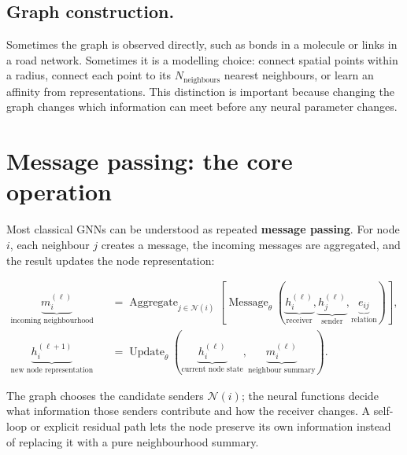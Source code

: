 \subsection{Graph construction.}
Sometimes the graph is observed directly, such as bonds in a molecule or links in a road network.
Sometimes it is a modelling choice: connect spatial points within a radius, connect each point to its $N_{\text{neighbours}}$ nearest neighbours, or learn an affinity from representations.
This distinction is important because changing the graph changes which information can meet before any neural parameter changes.

\section{Message passing: the core operation}
Most classical GNNs can be understood as repeated \textbf{message passing}.
For node $i$, each neighbour $j$ creates a message, the incoming messages are aggregated, and the result updates the node representation:

\[
\begin{aligned}
\underbrace{m_i^{(\ell)}}_{\text{incoming neighbourhood information}}
&=
\operatorname{Aggregate}_{j\in\mathcal N(i)}
\left[
\operatorname{Message}_{\theta}
\left(
\underbrace{h_i^{(\ell)}}_{\text{receiver}},
\underbrace{h_j^{(\ell)}}_{\text{sender}},
\underbrace{e_{ij}}_{\text{relation}}
\right)
\right],\\[1mm]
\underbrace{h_i^{(\ell+1)}}_{\text{new node representation}}
&=
\operatorname{Update}_{\theta}
\left(
\underbrace{h_i^{(\ell)}}_{\text{current node state}},
\underbrace{m_i^{(\ell)}}_{\text{neighbour summary}}
\right).
\end{aligned}
\]

The graph chooses the candidate senders $\mathcal N(i)$; the neural functions decide what information those senders contribute and how the receiver changes.
A self-loop or explicit residual path lets the node preserve its own information instead of replacing it with a pure neighbourhood summary.


